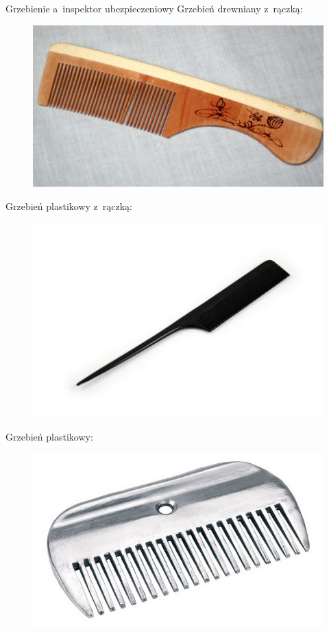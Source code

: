 \documentclass{beamer}
\begin{document}
\begin{frame}{Grzebienie a~inspektor ubezpieczeniowy}
	Grzebień drewniany z~rączką:
	\begin{figure}
	\includegraphics[scale=0.1]{grzebien_drewniany_raczka}
	\end{figure}
	Grzebień plastikowy z~rączką:
	\begin{figure}
	\includegraphics[scale=0.1]{grzebien_plastik_raczka}
	\end{figure}
	Grzebień plastikowy:
	\begin{figure}
	\includegraphics[scale=0.1]{grzebien_plastik}
	\end{figure}
\end{frame}
\end{document}
